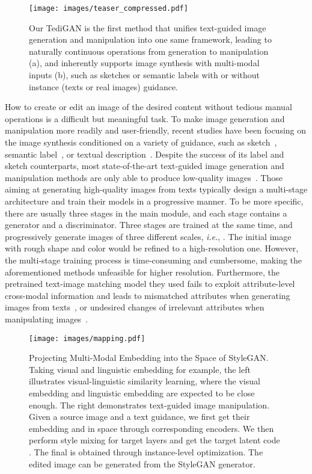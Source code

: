 \documentclass[final]{cvpr}
\def\ie{\emph{i.e.}}
\begin{document}
\begin{figure}[th]
\centering
\texttt{[image: images/teaser\_compressed.pdf]}
\caption{Our TediGAN is the first method that unifies text-guided image generation and manipulation into one same framework, leading to naturally continuous operations from generation to manipulation (a), and inherently supports image synthesis with multi-modal inputs (b), such as sketches or semantic labels with or without instance (texts or real images) guidance.
}
\label{fig:teaser}
\end{figure}
How to create or edit an image of the desired content without tedious manual operations is a difficult but meaningful task.
To make image generation and manipulation more readily and user-friendly, recent studies have been focusing on the image synthesis conditioned on a variety of guidance, such as sketch~\cite{ghosh2019isketchnfill,xia2019sketch}, semantic label~\cite{isola2017image,wang2018high}, or textual description~\cite{nam2018tagan,xu2018attngan}.
Despite the success of its label and sketch counterparts, most state-of-the-art text-guided image generation and manipulation methods are only able to produce low-quality images~\cite{reed2016generative,dong2017semantic}. 
Those aiming at generating high-quality images from texts typically design a multi-stage architecture and train their models in a progressive manner. 
To be more specific, there are usually three stages in the main module, and each stage contains a generator and a discriminator. Three stages are trained at the same time, and progressively generate images of three different scales, \ie, .
The initial image with rough shape and color would be refined to a high-resolution one. 
However, the multi-stage training process is time-consuming and cumbersome, making the aforementioned methods unfeasible for higher resolution.
Furthermore, the pretrained text-image matching model they used fails to exploit attribute-level cross-modal information and leads to mismatched attributes when generating images from texts~\cite{xu2018attngan,li2019control,zhu2019dmgan,cheng2020rifegan}, or undesired changes of irrelevant attributes when manipulating images~\cite{dong2017semantic,nam2018tagan,li2020manigan,li2020lightweight}.

\begin{figure}[t]
\centering
\texttt{[image: images/mapping.pdf]}
\caption{{Projecting Multi-Modal Embedding into the  Space of StyleGAN.} 
Taking visual and linguistic embedding for example, the left illustrates visual-linguistic similarity learning, where the visual embedding  and linguistic embedding  are expected to be close enough. 
The right demonstrates text-guided image manipulation.
Given a source image and a text guidance, we first get their embedding  and  in  space through corresponding encoders. We then perform style mixing for target layers and get the target latent code . The final  is obtained through instance-level optimization. The edited image can be generated from the StyleGAN generator.
}
\label{fig:mapping}
\end{figure}
\end{document}
